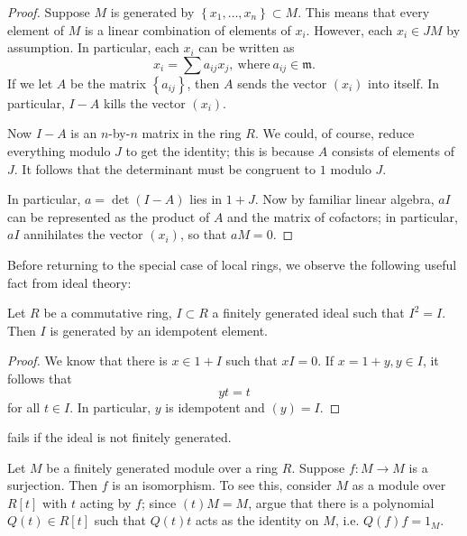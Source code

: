 \begin{proof}
Suppose $M$ is generated by $\left\{x_1, \dots, x_n\right\} \subset M$. This
means that every element of $M$ is  a linear combination of elements of
$x_i$. However, each $x_i \in JM$ by assumption. In particular, each
$x_i$ can be written as
\[ x_i = \sum a_{ij} x_j, \ \mathrm{where} \ a_{ij} \in \mathfrak{m}.  \]
If we let $A$ be the matrix $\left\{a_{ij}\right\}$, then $A$ sends the
vector  $(x_i)$ into itself. In particular, $I-A$ kills
the vector $(x_i)$.

Now $I-A$ is an $n$-by-$n$ matrix in the ring $R$. We could, of course,
reduce everything modulo $J$ to get the identity; this is
because $A$ consists of elements of $J$. It follows that the
determinant must be congruent to $1$ modulo $J$.

In particular, $a=\det (I - A)$ lies in $1+J$.  
Now by familiar linear algebra, $aI$ can be represented as the product of $A$
and the matrix of cofactors; in particular, $aI$ annihilates the vector
$(x_i)$, so that $aM=0$.
\end{proof}

Before returning to the special case of local rings, we observe the following
useful fact from ideal theory:

\begin{proposition}  \label{idempotentideal}
Let $R$ be a commutative ring, $I \subset R$ a finitely generated ideal such that $I^2 = I$.
Then $I$ is generated by an idempotent element.
\end{proposition} 
\begin{proof} 
We know that there is $x \in 1+I$ such that $xI =0$. If $x = 1+y, y \in I$, it
follows that 
\[ yt = t  \]
for all $t \in I$. In particular, $y$ is idempotent and $(y) = I$.
\end{proof} 

\begin{exercise} 
 fails if the ideal is not finitely generated.
\end{exercise} 

\begin{exercise} 
Let $M$ be a finitely generated module over a ring $R$. Suppose $f: M \to M$
is a surjection. Then $f$ is an isomorphism. To see this, consider $M$ as a
module over $R[t]$ with $t$ acting by $f$; since $(t)M = M$, argue that there
is a polynomial $Q(t) \in R[t]$ such that $Q(t)t$ acts as the identity on
$M$, i.e. $Q(f)f=1_M$.
\end{exercise} 

